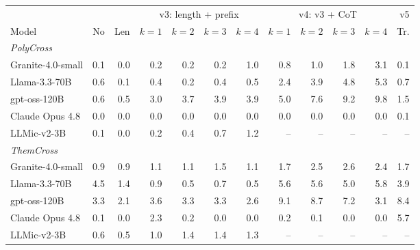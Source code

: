 \begin{tabular}{lrrrrrrrrrrr}
\toprule
 & \multicolumn{2}{c}{} & \multicolumn{4}{c}{v3: length + prefix} & \multicolumn{4}{c}{v4: v3 + CoT} & v5 \\
\cmidrule(lr){4-7}\cmidrule(lr){8-11}
Model & \multicolumn{1}{c}{No} & \multicolumn{1}{c}{Len} & $k{=}1$ & $k{=}2$ & $k{=}3$ & $k{=}4$ & $k{=}1$ & $k{=}2$ & $k{=}3$ & $k{=}4$ & \multicolumn{1}{c}{Tr.} \\
\midrule
\multicolumn{12}{l}{\textit{PolyCross}} \\
\quad Granite-4.0-small & 0.1 & 0.0 & 0.2 & 0.2 & 0.2 & 1.0 & 0.8 & 1.0 & 1.8 & 3.1 & 0.1 \\
\quad Llama-3.3-70B & 0.6 & 0.1 & 0.4 & 0.2 & 0.4 & 0.5 & 2.4 & 3.9 & 4.8 & 5.3 & 0.7 \\
\quad gpt-oss-120B & 0.6 & 0.5 & 3.0 & 3.7 & 3.9 & 3.9 & 5.0 & 7.6 & 9.2 & 9.8 & 1.5 \\
\quad Claude Opus 4.8 & 0.0 & 0.0 & 0.0 & 0.0 & 0.0 & 0.0 & 0.0 & 0.0 & 0.0 & 0.0 & 0.1 \\
\quad LLMic-v2-3B & 0.1 & 0.0 & 0.2 & 0.4 & 0.7 & 1.2 & -- & -- & -- & -- & -- \\
\midrule
\multicolumn{12}{l}{\textit{ThemCross}} \\
\quad Granite-4.0-small & 0.9 & 0.9 & 1.1 & 1.1 & 1.5 & 1.1 & 1.7 & 2.5 & 2.6 & 2.4 & 1.7 \\
\quad Llama-3.3-70B & 4.5 & 1.4 & 0.9 & 0.5 & 0.7 & 0.5 & 5.6 & 5.6 & 5.0 & 5.8 & 3.9 \\
\quad gpt-oss-120B & 3.3 & 2.1 & 3.6 & 3.3 & 3.3 & 2.6 & 9.1 & 8.7 & 7.2 & 3.1 & 8.4 \\
\quad Claude Opus 4.8 & 0.1 & 0.0 & 2.3 & 0.2 & 0.0 & 0.0 & 0.2 & 0.1 & 0.0 & 0.0 & 5.7 \\
\quad LLMic-v2-3B & 0.6 & 0.5 & 1.0 & 1.4 & 1.4 & 1.3 & -- & -- & -- & -- & -- \\
\bottomrule
\end{tabular}
